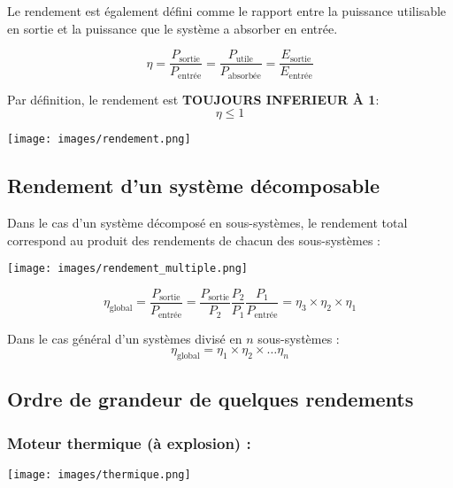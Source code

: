 \documentclass[10pt,fleqn]{article} %
\begin{document}
\begin{defi}
    Le rendement est également défini comme le rapport entre la puissance utilisable en sortie et la puissance que le système a absorber en entrée. 
    
    $$\eta = \frac{P_{\text{sortie}}}{P_{\text{entrée}}} = \frac{P_{\text{utile}}}{P_{\text{absorbée}}} = \frac{E_{\text{sortie}}}{E_{\text{entrée}}}$$
    
\parcoeur Par définition, le rendement est \textbf{TOUJOURS INFERIEUR À 1}: 
$$\eta \leq 1$$
\end{defi}

\begin{center}
    \texttt{[image: images/rendement.png]}
\end{center}

\subsection{Rendement d'un système décomposable}
Dans le cas d'un système décomposé en sous-systèmes, le rendement total correspond au produit des rendements de chacun des sous-systèmes : 
\begin{center}
    \texttt{[image: images/rendement\_multiple.png]}
\end{center}

\begin{exemple}
    $$\eta_{\text{global}} = \frac{P_{\text{sortie}}}{P_{\text{entrée}}} = \frac{P_{\text{sortie}}}{P_{\text{2}}} \frac{P_{\text{2}}}{P_{\text{1}}} \frac{P_{\text{1}}}{P_{\text{entrée}}} = \eta_3 \times \eta_2 \times \eta_1$$
\end{exemple}
    \begin{defi}
     Dans le cas général d'un systèmes divisé en $n$ sous-systèmes :  
       $$ \eta_{\text{global}} = \eta_1 \times \eta_2 \times \dots \eta_n $$
    \end{defi}

\subsection{Ordre de grandeur de quelques rendements}
\subsubsection{Moteur thermique (à explosion) :}
\begin{center}
    \texttt{[image: images/thermique.png]}
\end{center}
\end{document}
